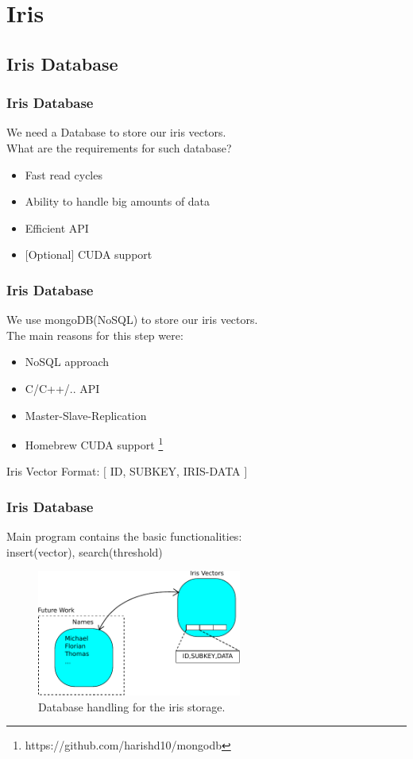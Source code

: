 \documentclass{beamer}
\begin{document}
\section{Iris}
\subsection{Iris Database}
\begin{frame}
\frametitle{Iris Database}
We need a Database to store our iris vectors.\\
What are the requirements for such database?\\
  \begin{itemize}
    \item Fast read cycles
    \item Ability to handle big amounts of data
    \item Efficient API
    \item $[$Optional$]$ CUDA support
  \end{itemize}
\end{frame}

\begin{frame}
\frametitle{Iris Database}
We use mongoDB(NoSQL) to store our iris vectors.\\
The main reasons for this step were:\\
  \begin{itemize}
    \item NoSQL approach
    \item C/C++/.. API
    \item Master-Slave-Replication
    \item Homebrew CUDA support \footnote{https://github.com/harishd10/mongodb}
  \end{itemize}
  Iris Vector Format: $[$ ID, SUBKEY, IRIS-DATA $]$
\end{frame}


\begin{frame}
\frametitle{Iris Database}
Main program contains the basic functionalities: \\insert(vector), search(threshold)
    \begin{figure}[hp]
       \includegraphics[width=0.60\textwidth]{../report/iris/Database_Approach.pdf}
       \caption{Database handling for the iris storage.}
     \label{fig:flow}
   \end{figure}
\end{frame}
\end{document}
